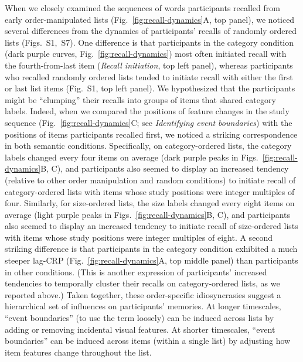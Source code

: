 \documentclass[11pt]{article}
\newcommand{\dynamicsRandom}{S1}
\newcommand{\recallInit}{S7}
\begin{document}
When we closely examined the sequences of words participants recalled from
early order-manipulated lists (Fig.~\ref{fig:recall-dynamics}A, top panel), we
noticed several differences from the dynamics of participants' recalls of
randomly ordered lists (Figs.~\dynamicsRandom,~\recallInit). One difference is
that participants in the category condition (dark purple curves,
Fig.~\ref{fig:recall-dynamics}) most often initiated recall with the
fourth-from-last item (\textit{Recall initiation}, top left panel), whereas
participants who recalled randomly ordered lists tended to initiate recall with
either the first or last list items (Fig.~\dynamicsRandom, top left panel). We
hypothesized that the participants might be ``clumping'' their recalls into
groups of items that shared category labels. Indeed, when we compared the
positions of feature changes in the study sequence
(Fig.~\ref{fig:recall-dynamics}C; see \textit{Identifying event boundaries})
with the positions of items participants recalled first, we noticed a striking
correspondence in both semantic conditions. Specifically, on category-ordered
lists, the category labels changed every four items on average (dark purple
peaks in Figs.~\ref{fig:recall-dynamics}B, C), and participants also seemed to
display an increased tendency (relative to other order manipulation and random
conditions) to initiate recall of category-ordered lists with items whose study
positions were integer multiples of four. Similarly, for size-ordered lists,
the size labels changed every eight items on average (light purple peaks in
Figs.~\ref{fig:recall-dynamics}B, C), and participants also seemed to display an
increased tendency to initiate recall of size-ordered lists with items whose
study positions were integer multiples of eight. A second striking difference
is that participants in the category condition exhibited a much steeper lag-CRP
(Fig.~\ref{fig:recall-dynamics}A, top middle panel) than participants in other
conditions. (This is another expression of participants' increased tendencies
to temporally cluster their recalls on category-ordered lists, as we reported
above.) Taken together, these order-specific idiosyncrasies suggest a
hierarchical set of influences on participants' memories. At longer timescales,
``event boundaries'' (to use the term loosely) can be induced across lists by
adding or removing incidental visual features. At shorter timescales, ``event
boundaries'' can be induced across items (within a single list) by adjusting
how item features change throughout the list.
\end{document}
